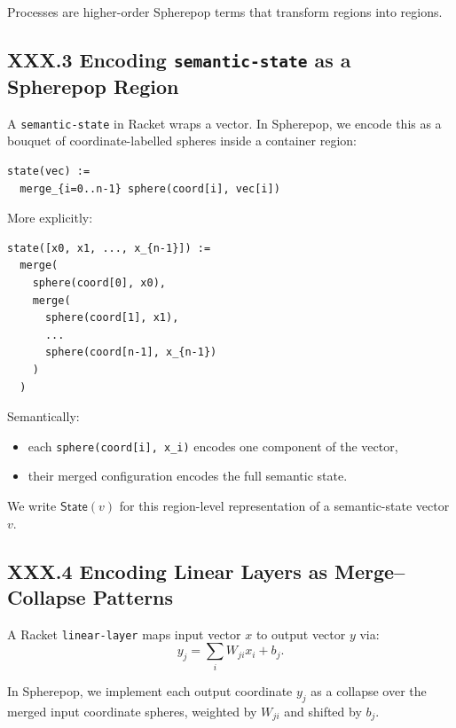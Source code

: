 \documentclass[12pt,letterpaper]{article}
\begin{document}
Processes are higher-order Spherepop terms that transform regions into regions.

\subsection{XXX.3 Encoding \texttt{semantic-state} as a Spherepop Region}

A \texttt{semantic-state} in Racket wraps a vector. In Spherepop, we encode this as a bouquet of coordinate-labelled spheres inside a container region:

\begin{verbatim}
state(vec) :=
  merge_{i=0..n-1} sphere(coord[i], vec[i])
\end{verbatim}

More explicitly:

\begin{verbatim}
state([x0, x1, ..., x_{n-1}]) :=
  merge(
    sphere(coord[0], x0),
    merge(
      sphere(coord[1], x1),
      ...
      sphere(coord[n-1], x_{n-1})
    )
  )
\end{verbatim}

Semantically:

\begin{itemize}
  \item each \verb|sphere(coord[i], x_i)| encodes one component of the vector,
  \item their merged configuration encodes the full semantic state.
\end{itemize}

We write $\mathsf{State}(v)$ for this region-level representation of a semantic-state vector $v$.

\subsection{XXX.4 Encoding Linear Layers as Merge--Collapse Patterns}

A Racket \texttt{linear-layer} maps input vector $x$ to output vector $y$ via:
\[
y_j = \sum_i W_{ji} x_i + b_j.
\]

In Spherepop, we implement each output coordinate $y_j$ as a collapse over the merged input coordinate spheres, weighted by $W_{ji}$ and shifted by $b_j$.
\end{document}
